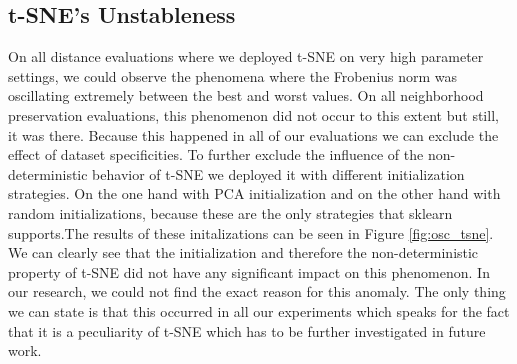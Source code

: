 \subsection{t-SNE's Unstableness}

On all distance evaluations where we deployed t-SNE on very high parameter settings, we could observe the phenomena where the Frobenius norm was oscillating extremely between the best and worst values. On all neighborhood preservation evaluations, this phenomenon did not occur to this extent but still, it was there. Because this happened in all of our evaluations we can exclude the effect of dataset specificities. To further exclude the influence of the non-deterministic behavior of t-SNE we deployed it with different initialization strategies. On the one hand with PCA initialization and on the other hand with random initializations, because these are the only strategies that sklearn supports.\footnotemark The results of these initalizations can be seen in Figure \ref{fig:osc_tsne}. We can clearly see that the initialization and therefore the non-deterministic property of t-SNE did not have any significant impact on this phenomenon. In our research, we could not find the exact reason for this anomaly. The only thing we can state is that this occurred in all our experiments which speaks for the fact that it is a peculiarity of t-SNE which has to be further investigated in future work.

